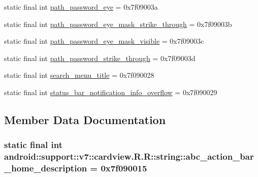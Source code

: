\begin{CompactItemize}
\item 
static final int \hyperlink{classandroid_1_1support_1_1v7_1_1cardview_1_1_r_1_1string_77f0de2a1cb155b895ed5a6f25243c64}{path\_\-password\_\-eye} = 0x7f09003a
\item 
static final int \hyperlink{classandroid_1_1support_1_1v7_1_1cardview_1_1_r_1_1string_6cf1c3e55b319e0b16b48c71a615fc63}{path\_\-password\_\-eye\_\-mask\_\-strike\_\-through} = 0x7f09003b
\item 
static final int \hyperlink{classandroid_1_1support_1_1v7_1_1cardview_1_1_r_1_1string_162bb4e9ab40d41f178f34ed1a0dbccd}{path\_\-password\_\-eye\_\-mask\_\-visible} = 0x7f09003c
\item 
static final int \hyperlink{classandroid_1_1support_1_1v7_1_1cardview_1_1_r_1_1string_a486f95070cb94d69628120b52bc30b8}{path\_\-password\_\-strike\_\-through} = 0x7f09003d
\item 
static final int \hyperlink{classandroid_1_1support_1_1v7_1_1cardview_1_1_r_1_1string_29cc50bcc79d1233dabee5030a96d9ab}{search\_\-menu\_\-title} = 0x7f090028
\item 
static final int \hyperlink{classandroid_1_1support_1_1v7_1_1cardview_1_1_r_1_1string_ee502100c12fc09c1582b3a619542961}{status\_\-bar\_\-notification\_\-info\_\-overflow} = 0x7f090029
\end{CompactItemize}


\subsection{Member Data Documentation}
\hypertarget{classandroid_1_1support_1_1v7_1_1cardview_1_1_r_1_1string_0dd1d9d08b1d933f6d6a99c8751f3a14}{
\subsubsection[{abc\_\-action\_\-bar\_\-home\_\-description}]{\setlength{\rightskip}{0pt plus 5cm}static final int android::support::v7::cardview.R.R::string::abc\_\-action\_\-bar\_\-home\_\-description = 0x7f090015}}
\label{classandroid_1_1support_1_1v7_1_1cardview_1_1_r_1_1string_0dd1d9d08b1d933f6d6a99c8751f3a14}


